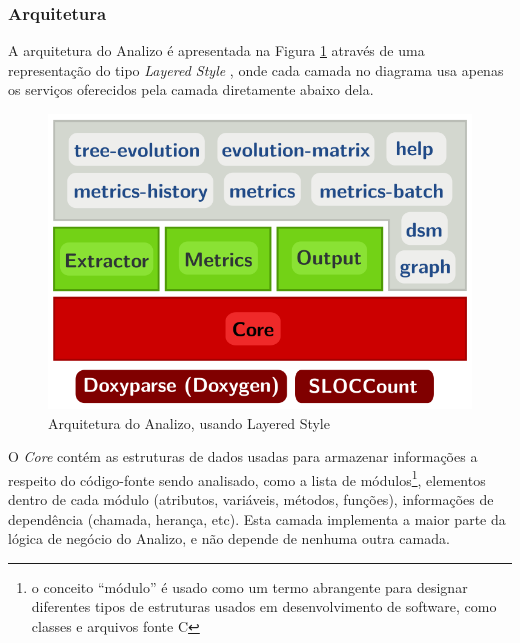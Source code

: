 
\subsubsection{Arquitetura}

A arquitetura do Analizo é apresentada na Figura \ref{arquitetura-analizo}
através de uma representação do tipo {\it Layered Style} \cite{Clements2002},
onde cada camada no diagrama usa apenas os serviços oferecidos pela camada
diretamente abaixo dela.

\begin{figure}[h]
\center
\includegraphics[scale=0.3]{imagens/analizo-architecture.png}
\caption{Arquitetura do Analizo, usando Layered Style \cite{Clements2002}}
\label{arquitetura-analizo}
\end{figure}

O {\it Core} contém as estruturas de dados usadas para armazenar informações a
respeito do código-fonte sendo analisado, como a lista de módulos\footnote{o
conceito ``módulo'' é usado como um termo abrangente para designar diferentes
tipos de estruturas usados em desenvolvimento de software, como classes e
arquivos fonte C}, elementos dentro de cada módulo (atributos, variáveis,
métodos, funções), informações de dependência (chamada, herança, etc). Esta
camada implementa a maior parte da lógica de negócio do Analizo, e não depende
de nenhuma outra camada.

